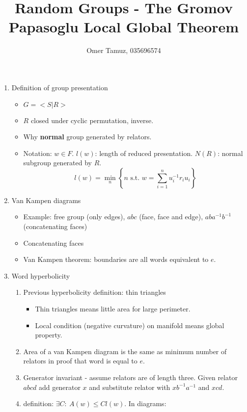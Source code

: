 \documentclass[11pt]{article} \usepackage{amssymb}
\begin{document}
\title{Random Groups - The Gromov Papasoglu Local Global Theorem}

 \author{Omer Tamuz, 035696574}
\maketitle

\begin{enumerate}
\item Definition of group presentation
  \begin{itemize}
  \item $G=<S|R>$
  \item $R$ closed under cyclic permutation, inverse.
  \item Why {\bf normal} group generated by relators.
  \item Notation: $w\in F$. $l(w)$: length of reduced presentation.
    $N(R)$: normal subgroup generated by $R$.
    $$ l(w)=\min_n\left\{n\mbox{ s.t. } w=\sum_{i=1}^nu_i^{-1}r_iu_i\right\}$$
  \end{itemize}
\item Van Kampen diagrams
  \begin{itemize}
  \item Example: free group (only edges), $abc$ (face, face and edge),
    $aba^{-1}b^{-1}$ (concatenating faces)
  \item Concatenating faces
  \item Van Kampen theorem: boundaries are all words equivalent to $e$.
  \end{itemize} 
\item Word hyperbolicity
  \begin{enumerate}
  \item Previous hyperbolicity definition: thin triangles
    \begin{itemize}
    \item Thin triangles means little area for large perimeter.
    \item Local condition (negative curvature) on manifold means global 
      property.
    \end{itemize}
  \item Area of a van Kampen diagram is the same as minimum number of relators 
    in proof that word is equal to $e$.
  \item Generator invariant - assume relators are of length three. Given
    relator $abcd$ add generator $x$ and substitute relator with $xb^{-1}a^{-1}$ and
    $xcd$.
  \item definition: $\exists C:\: A(w)\leq Cl(w)$. In diagrams:

\end{enumerate}
\end{enumerate}
\end{document}
